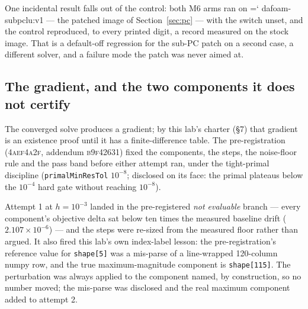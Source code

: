 \documentclass[11pt,a4paper]{article}
\newcommand{\artifact}[1]{{\small\ttfamily\hyphenchar\font=`\-\relax
  \def\_{\textunderscore\allowbreak}#1}}
\newcommand{\commit}[1]{\textsc{\small #1}}
\begin{document}
One incidental result falls out of the control: both M6 arms ran on
\artifact{dafoam-subpclu:v1} --- the patched image of Section~\ref{sec:pc} --- with the switch
unset, and the control reproduced, to every printed digit, a record measured on the stock
image. That is a default-off regression for the sub-PC patch on a second case, a different
solver, and a failure mode the patch was never aimed at.

\subsection{The gradient, and the two components it does not certify}

The converged solve produces a gradient; by this lab's charter (\S7) that gradient is an
existence proof until it has a finite-difference table. The pre-registration
(\commit{4aef4a2f}, addendum \commit{b9f42631}) fixed the components, the steps, the
noise-floor rule and the pass band before either attempt ran, under the tight-primal
discipline (\texttt{primalMinResTol} \(10^{-8}\); disclosed on its face: the primal plateaus
below the \(10^{-4}\) hard gate without reaching \(10^{-8}\)).

Attempt 1 at \(h=10^{-3}\) landed in the pre-registered \emph{not evaluable} branch --- every
component's objective delta sat below ten times the measured baseline drift
(\(2.107\times10^{-6}\)) --- and the steps were re-sized from the measured floor rather than
argued. It also fired this lab's own index-label lesson: the pre-registration's reference value
for \texttt{shape[5]} was a mis-parse of a line-wrapped 120-column numpy row, and the true
maximum-magnitude component is \texttt{shape[115]}. The perturbation was always applied to the
component named, by construction, so no number moved; the mis-parse was disclosed and the real
maximum component added to attempt 2.
\end{document}
